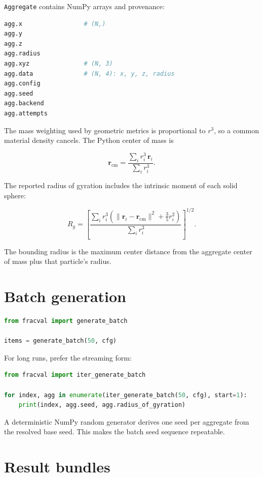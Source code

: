 \documentclass[11pt,oneside]{report}
\newcommand{\code}[1]{\texttt{#1}}
\begin{document}
\code{Aggregate} contains NumPy arrays and provenance:

\begin{lstlisting}[language=Python]
agg.x                 # (N,)
agg.y
agg.z
agg.radius
agg.xyz               # (N, 3)
agg.data              # (N, 4): x, y, z, radius
agg.config
agg.seed
agg.backend
agg.attempts
\end{lstlisting}

The mass weighting used by geometric metrics is proportional to \(r^3\), so a
common material density cancels. The Python center of mass is

\begin{equation}
\mathbf{r}_{\mathrm{cm}} =
\frac{\sum_i r_i^3\,\mathbf{r}_i}{\sum_i r_i^3}.
\end{equation}

The reported radius of gyration includes the intrinsic moment of each solid
sphere:

\begin{equation}
R_g = \left[
\frac{\sum_i r_i^3\left(\lVert\mathbf{r}_i-\mathbf{r}_{\mathrm{cm}}\rVert^2
+ \frac{3}{5}r_i^2\right)}{\sum_i r_i^3}
\right]^{1/2}.
\end{equation}

The bounding radius is the maximum center distance from the aggregate center of
mass plus that particle's radius.

\section{Batch generation}

\begin{lstlisting}[language=Python]
from fracval import generate_batch

items = generate_batch(50, cfg)
\end{lstlisting}

For long runs, prefer the streaming form:

\begin{lstlisting}[language=Python]
from fracval import iter_generate_batch

for index, agg in enumerate(iter_generate_batch(50, cfg), start=1):
    print(index, agg.seed, agg.radius_of_gyration)
\end{lstlisting}

A deterministic NumPy random generator derives one seed per aggregate from the
resolved base seed. This makes the batch seed sequence repeatable.

\section{Result bundles}
\end{document}
